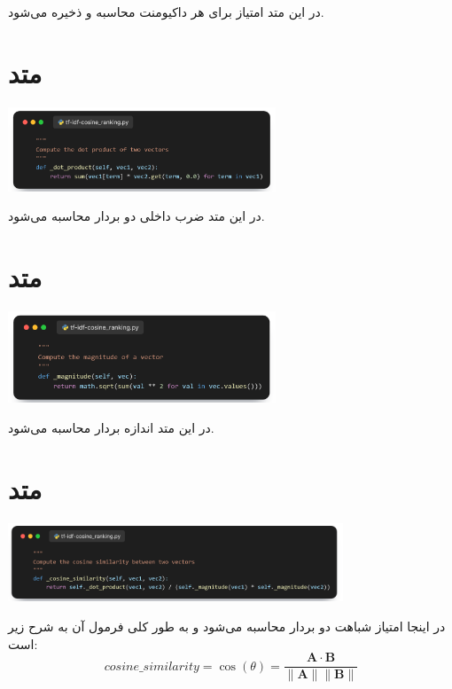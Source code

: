 \documentclass[12pt, dvipsnames, svgnames, x11names,]{article}
\begin{document}
		{\normalsize 
			در این متد امتیاز  برای هر داکیومنت محاسبه و ذخیره می‌شود.
		}		
		
	\section{متد }
		
		\begin{center}
		{\includegraphics[width=8cm]{images/08.png}}
		\end{center}
		
		{\normalsize 
		در این متد ضرب داخلی دو بردار محاسبه می‌شود.
		}
				
		
	\section{متد }
		
		\begin{center}
			{\includegraphics[width=8cm]{images/09.png}}
		\end{center}
		
		{\normalsize 
			در این متد اندازه بردار محاسبه می‌شود.
		}
		
	\section{متد }
		
		\begin{center}
			{\includegraphics[width=10cm]{images/10.png}}
		\end{center}
		
		{\normalsize 
			در اینجا امتیاز شباهت دو بردار محاسبه می‌شود و به طور کلی فرمول آن به شرح زیر است:
		}
		$$
		cosine\_similarity = \cos(\theta) = \frac{\mathbf{A} \cdot \mathbf{B}}{\|\mathbf{A}\| \|\mathbf{B}\|}
		$$
		
\end{document}
